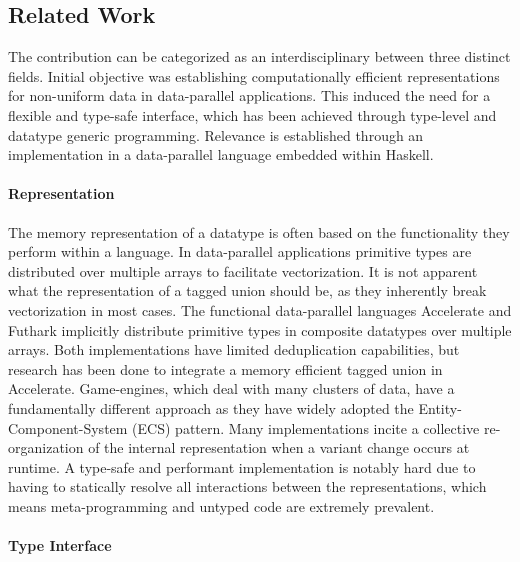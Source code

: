 \documentclass{article}
\begin{document}
\subsection{Related Work}

The contribution can be categorized as an interdisciplinary between three distinct fields.
Initial objective was establishing computationally efficient representations for non-uniform data in data-parallel applications.
This induced the need for a flexible and type-safe interface, which has been achieved through type-level and datatype generic programming.
Relevance is established through an implementation in a data-parallel language embedded within Haskell.

\paragraph{Representation}

The memory representation of a datatype is often based on the functionality they perform within a language.
In data-parallel applications primitive types are distributed over multiple arrays to facilitate vectorization.
It is not apparent what the representation of a tagged union should be, as they inherently break vectorization in most cases. 
The functional data-parallel languages Accelerate\cite{accelerate-sum-types} and Futhark\cite{futhark-sum-types} implicitly distribute primitive types in composite datatypes over multiple arrays.
Both implementations have limited deduplication capabilities, but research has been done to integrate a memory efficient tagged union in Accelerate\cite{accelerate-sum-types}.
Game-engines, which deal with many clusters of data, have a fundamentally different approach as they have widely adopted the Entity-Component-System (ECS) pattern. 
Many implementations incite a collective re-organization of the internal representation when a variant change occurs at runtime.
A type-safe and performant implementation is notably hard due to having to statically resolve all interactions between the representations, which means meta-programming and untyped code are extremely prevalent. 

\paragraph{Type Interface}
\end{document}
